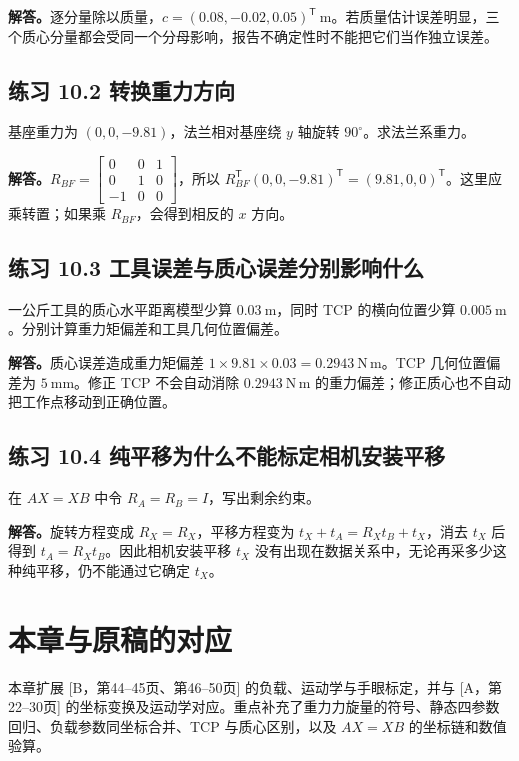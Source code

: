 \textbf{解答。}逐分量除以质量，$c=(0.08,-0.02,0.05)^{\mathsf T}\ \mathrm m$。若质量估计误差明显，三个质心分量都会受同一个分母影响，报告不确定性时不能把它们当作独立误差。

\subsection*{练习 10.2 转换重力方向}
基座重力为 $(0,0,-9.81)$，法兰相对基座绕 $y$ 轴旋转 $90^\circ$。求法兰系重力。

\textbf{解答。}$R_{BF}=\begin{bmatrix}0&0&1\\0&1&0\\-1&0&0\end{bmatrix}$，所以
$R_{BF}^{\mathsf T}(0,0,-9.81)^{\mathsf T}=(9.81,0,0)^{\mathsf T}$。这里应乘转置；如果乘 $R_{BF}$，会得到相反的 $x$ 方向。

\subsection*{练习 10.3 工具误差与质心误差分别影响什么}
一公斤工具的质心水平距离模型少算 $0.03\ \mathrm m$，同时 TCP 的横向位置少算 $0.005\ \mathrm m$。分别计算重力矩偏差和工具几何位置偏差。

\textbf{解答。}质心误差造成重力矩偏差 $1\times9.81\times0.03=0.2943\ \mathrm{N\,m}$。TCP 几何位置偏差为 $5\ \mathrm{mm}$。修正 TCP 不会自动消除 $0.2943\ \mathrm{N\,m}$ 的重力偏差；修正质心也不自动把工作点移动到正确位置。

\subsection*{练习 10.4 纯平移为什么不能标定相机安装平移}
在 $AX=XB$ 中令 $R_A=R_B=I$，写出剩余约束。

\textbf{解答。}旋转方程变成 $R_X=R_X$，平移方程变为 $t_X+t_A=R_Xt_B+t_X$，消去 $t_X$ 后得到 $t_A=R_Xt_B$。因此相机安装平移 $t_X$ 没有出现在数据关系中，无论再采多少这种纯平移，仍不能通过它确定 $t_X$。

\section*{本章与原稿的对应}
本章扩展 [B，第44--45页、第46--50页] 的负载、运动学与手眼标定，并与 [A，第22--30页] 的坐标变换及运动学对应。重点补充了重力力旋量的符号、静态四参数回归、负载参数同坐标合并、TCP 与质心区别，以及 $AX=XB$ 的坐标链和数值验算。
